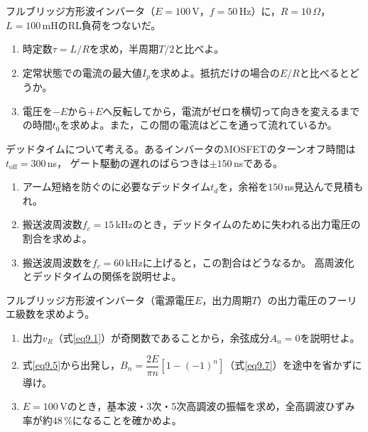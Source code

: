\begin{章末問題}
\item \label{ex9.1}フルブリッジ方形波インバータ（$E = 100$\,V，$f = 50$\,Hz）に，$R = 10\,\Omega$，$L = 100$\,mHのRL負荷をつないだ。
\begin{enumerate}
\item[(a)] 時定数$\tau = L/R$を求め，半周期$T/2$と比べよ。
\item[(b)] 定常状態での電流の最大値$I_p$を求めよ。抵抗だけの場合の$E/R$と比べるとどうか。
\item[(c)] 電圧を$-E$から$+E$へ反転してから，電流がゼロを横切って向きを変えるまでの時間$t_0$を求めよ。また，この間の電流はどこを通って流れているか。
\end{enumerate}

\item \label{ex9.2}デッドタイムについて考える。あるインバータのMOSFETのターンオフ時間は$t_{\mathrm{off}} = 300$\,ns，
ゲート駆動の遅れのばらつきは$\pm 150$\,nsである。
\begin{enumerate}
\item[(a)] アーム短絡を防ぐのに必要なデッドタイム$t_d$を，余裕を$150$\,ns見込んで見積もれ。
\item[(b)] 搬送波周波数$f_c = 15$\,kHzのとき，デッドタイムのために失われる出力電圧の割合を求めよ。
\item[(c)] 搬送波周波数を$f_c = 60$\,kHzに上げると，この割合はどうなるか。
高周波化とデッドタイムの関係を説明せよ。
\end{enumerate}

\item \label{ex9.3}フルブリッジ方形波インバータ（電源電圧$E$，出力周期$T$）の出力電圧のフーリエ級数を求めよう。
\begin{enumerate}
\item[(a)] 出力$v_R$（式\ref{eq9.1}）が奇関数であることから，余弦成分$A_n = 0$を説明せよ。
\item[(b)] 式\ref{eq9.5}から出発し，$B_n = \dfrac{2E}{\pi n}[1-(-1)^n]$（式\ref{eq9.7}）を途中を省かずに導け。
\item[(c)] $E = 100$\,Vのとき，基本波・3次・5次高調波の振幅を求め，全高調波ひずみ率が約$48$\,\%になることを確かめよ。
\end{enumerate}


\end{章末問題}
